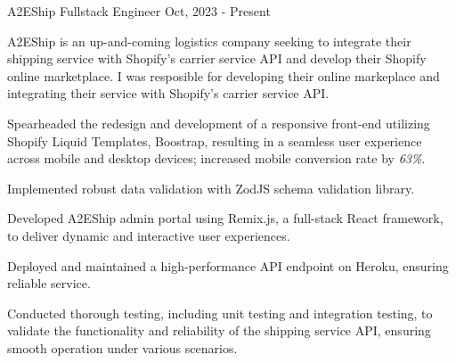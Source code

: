 \cventry
{A2EShip} %
{Fullstack Engineer} %
{ }
{Oct, 2023 - Present}
{
	A2EShip is an up-and-coming logistics company seeking to integrate their shipping service with Shopify's carrier service API and develop their Shopify online marketplace. I was resposible for developing their online markeplace and integrating their service with Shopify's carrier service API.
	\begin{cvitemsdesc} %
		\item {Spearheaded the redesign and development of a responsive front-end utilizing Shopify Liquid Templates, Boostrap, resulting in a seamless user experience across mobile and desktop devices; increased mobile conversion rate by \emph{63\%}.}
		\item {Implemented robust data validation with ZodJS schema validation library.}
		\item {Developed A2EShip admin portal using Remix.js, a full-stack React framework, to deliver dynamic and interactive user experiences.}
		\item {Deployed and maintained a high-performance API endpoint on Heroku, ensuring reliable service.}
		\item {Conducted thorough testing, including unit testing and integration testing, to validate the functionality and reliability of the shipping service API, ensuring smooth operation under various scenarios.}
	\end{cvitemsdesc}
}
